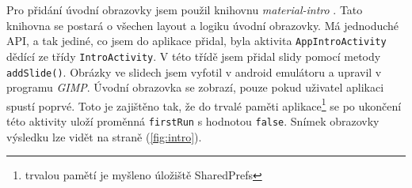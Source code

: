 \documentclass[../TakeYourPill.tex]{subfiles}
\begin{document}
Pro přidání úvodní obrazovky jsem použil knihovnu \textit{material-intro} \cite{intro}. Tato knihovna se postará o všechen layout a logiku úvodní obrazovky. Má jednoduché API, a tak jediné, co jsem do aplikace přidal, byla aktivita \texttt{AppIntroActivity} dědící ze třídy \texttt{IntroActivity}. V této třídě jsem přidal slidy pomocí metody \texttt{addSlide()}. Obrázky ve slidech jsem vyfotil v android emulátoru a upravil v programu \textit{GIMP}. Úvodní obrazovka se zobrazí, pouze pokud uživatel aplikaci spustí poprvé. Toto je zajištěno tak, že do trvalé paměti aplikace\footnote{trvalou pamětí je myšleno úložiště SharedPrefs} se po ukončení této aktivity uloží proměnná \texttt{firstRun} s hodnotou \texttt{false}. Snímek obrazovky výsledku lze vidět na straně \pageref{fig:intro} (\ref{fig:intro}).
\end{document}
